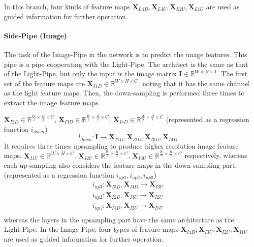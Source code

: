 In this branch, four kinds of feature maps $ \textbf{X}_{L4D}, \textbf{X}_{L3U}, \textbf{X}_{L2U}, \textbf{X}_{L1U} $ are used as guided information for further operation.

\paragraph{Side-Pipe (Image)}

The task of the Image-Pipe in the network is to predict the image features. This pipe is a pipe cooperating with the Light-Pipe. The architect is the same as that of the Light-Pipe, but only the input is the image matrix $ \textbf{I}\in \mathbb{R}^{W\times H\times 1}$. The first set of the feature maps are $ \textbf{X}_{I1D} \in \mathbb{R}^{{W}\times H\times C} $, noting that it has the same channel as the light feature maps. Then, the down-sampling is performed three times to extract the image feature maps

$ \textbf{X}_{I2D} \in \mathbb{R}^{\frac{W}{2}\times \frac{H}{2}\times C} $,
$ \textbf{X}_{I3D} \in \mathbb{R}^{\frac{W}{4}\times \frac{H}{4}\times C} $,
$ \textbf{X}_{I4D} \in \mathbb{R}^{\frac{W}{8}\times \frac{H}{8}\times C} $
(represented as a regression function $ i_{down} $)
\[ l_{down}: \textbf{I} \rightarrow  \textbf{X}_{I1D} , \textbf{X}_{I2D}, \textbf{X}_{I3D}, \textbf{X}_{I4D} \]
It requires three times upsampling to produce higher resolution image feature maps.
$ \textbf{X}_{I1U} \in \mathbb{R}^{{W}\times {H}\times C} $,
$ \textbf{X}_{I2U} \in \mathbb{R}^{\frac{W}{2}\times \frac{H}{2}\times C} $,
$ \textbf{X}_{I3U} \in \mathbb{R}^{\frac{W}{4}\times \frac{H}{4}\times C} $ respectively, whereas each up-sampling also considers the feature maps in the down-sampling part,
(represented as a regression function $ i_{up1}, i_{up2}, i_{up3} $)
\[ 
\begin{matrix}
	i_{up3} : \textbf{X}_{I3D}, \textbf{X}_{I4D} \rightarrow \textbf{X}_{I3U} \\
	i_{up2} : \textbf{X}_{I2D}, \textbf{X}_{I3U} \rightarrow \textbf{X}_{I2U} \\
	i_{up1} : \textbf{X}_{I1D}, \textbf{X}_{I2U} \rightarrow \textbf{X}_{I1U} \\
\end{matrix}
\]
whereas the layers in the upsampling part have the same architecture as the Light Pipe. In the Image Pipe, four types of feature maps $ \textbf{X}_{I4D}, \textbf{X}_{I3U}, \textbf{X}_{I2U}, \textbf{X}_{I1U} $ are used as guided information for further operation.


